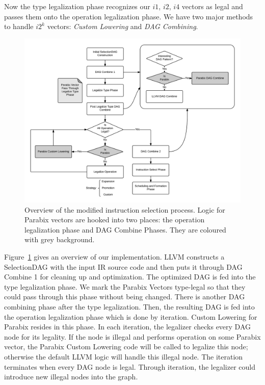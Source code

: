 Now the type legalization phase recognizes our $i1$, $i2$, $i4$ vectors as legal and passes them onto the operation legalization phase. We have two major methods to handle $i2^k$ vectors: \textit{Custom Lowering} and \textit{DAG Combining}.

\begin{figure}[ht!]
\centering
\includegraphics[width=140mm]{draw/system.png}
\caption[System overview: modified instruction selection process]{Overview of the modified instruction selection process. Logic for Parabix vectors are hooked into two places: the operation legalization phase and DAG Combine Phases. They are coloured with grey background.}
\label{figure:system}
\end{figure}

Figure~\ref{figure:system} gives an overview of our implementation. LLVM constructs a SelectionDAG with the input IR source code and then puts it through DAG Combine 1 for cleaning up and optimization. The optimized DAG is fed into the type legalization phase. We mark the Parabix Vectors type-legal so that they could pass through this phase without being changed. There is another DAG combining phase after the type legalization. Then, the resulting DAG is fed into the operation legalization phase which is done by iteration. Custom Lowering for Parabix resides in this phase. In each iteration, the legalizer checks every DAG node for its legality. If the node is illegal and performs operation on some Parabix vector, the Parabix Custom Lowering code will be called to legalize this node; otherwise the default LLVM logic will handle this illegal node. The iteration terminates when every DAG node is legal. Through iteration, the legalizer could introduce new illegal nodes into the graph.

